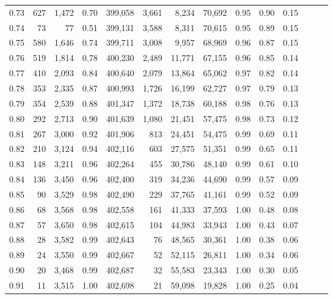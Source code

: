 \begin{tabular}{rrrrrrrrrrrrrr}
0.73 &    627 &  1,472 &  0.70 &  399,058 &    3,661 &   8,234 &  70,692 &  0.95 &  0.90 &      0.15 \\
0.74 &     73 &     77 &  0.51 &  399,131 &    3,588 &   8,311 &  70,615 &  0.95 &  0.89 &      0.15 \\
0.75 &    580 &  1,646 &  0.74 &  399,711 &    3,008 &   9,957 &  68,969 &  0.96 &  0.87 &      0.15 \\
0.76 &    519 &  1,814 &  0.78 &  400,230 &    2,489 &  11,771 &  67,155 &  0.96 &  0.85 &      0.14 \\
0.77 &    410 &  2,093 &  0.84 &  400,640 &    2,079 &  13,864 &  65,062 &  0.97 &  0.82 &      0.14 \\
0.78 &    353 &  2,335 &  0.87 &  400,993 &    1,726 &  16,199 &  62,727 &  0.97 &  0.79 &      0.13 \\
0.79 &    354 &  2,539 &  0.88 &  401,347 &    1,372 &  18,738 &  60,188 &  0.98 &  0.76 &      0.13 \\
0.80 &    292 &  2,713 &  0.90 &  401,639 &    1,080 &  21,451 &  57,475 &  0.98 &  0.73 &      0.12 \\
0.81 &    267 &  3,000 &  0.92 &  401,906 &      813 &  24,451 &  54,475 &  0.99 &  0.69 &      0.11 \\
0.82 &    210 &  3,124 &  0.94 &  402,116 &      603 &  27,575 &  51,351 &  0.99 &  0.65 &      0.11 \\
0.83 &    148 &  3,211 &  0.96 &  402,264 &      455 &  30,786 &  48,140 &  0.99 &  0.61 &      0.10 \\
0.84 &    136 &  3,450 &  0.96 &  402,400 &      319 &  34,236 &  44,690 &  0.99 &  0.57 &      0.09 \\
0.85 &     90 &  3,529 &  0.98 &  402,490 &      229 &  37,765 &  41,161 &  0.99 &  0.52 &      0.09 \\
0.86 &     68 &  3,568 &  0.98 &  402,558 &      161 &  41,333 &  37,593 &  1.00 &  0.48 &      0.08 \\
0.87 &     57 &  3,650 &  0.98 &  402,615 &      104 &  44,983 &  33,943 &  1.00 &  0.43 &      0.07 \\
0.88 &     28 &  3,582 &  0.99 &  402,643 &       76 &  48,565 &  30,361 &  1.00 &  0.38 &      0.06 \\
0.89 &     24 &  3,550 &  0.99 &  402,667 &       52 &  52,115 &  26,811 &  1.00 &  0.34 &      0.06 \\
0.90 &     20 &  3,468 &  0.99 &  402,687 &       32 &  55,583 &  23,343 &  1.00 &  0.30 &      0.05 \\
0.91 &     11 &  3,515 &  1.00 &  402,698 &       21 &  59,098 &  19,828 &  1.00 &  0.25 &      0.04 \\

\end{tabular}
